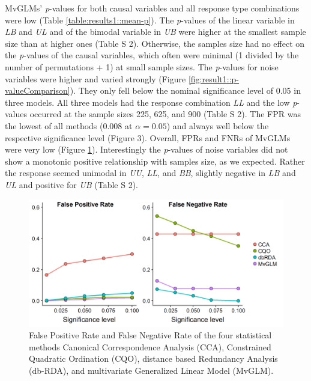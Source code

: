 		MvGLMs' \textit{p}-values for both causal variables and all response type combinations were low (Table  \ref{table:results1::mean-p}).
        The \textit{p}-values of the linear variable in \textit{LB} and \textit{UL} and of the bimodal variable in \textit{UB} were higher at the smallest sample size than at higher ones (Table S 2).  
		Otherwise, the samples size had no effect on the \textit{p}-values of the causal variables, which often were minimal (1 divided by the number of permutations + 1) at small sample sizes.
		The \textit{p}-values for noise variables were higher and varied strongly (Figure \ref{fig:result1::p-valueComparison}).
		They only fell below the nominal significance level of 0.05 in three models. 
		All three models had the response combination \textit{LL} and the low \textit{p}-values occurred at the sample sizes 225, 625, and 900 (Table S 2).
		The FPR was the lowest of all methods (0.008 at $\alpha = 0.05$) and always well below the respective significance level (Figure 3). 
		Overall, FPRs and FNRs of MvGLMs were very low (Figure \ref{fig:FPNR}).
        Interestingly the \textit{p}-values of noise variables did not show a monotonic positive relationship with samples size, as we expected. 
        Rather the response seemed unimodal in \textit{UU}, \textit{LL}, and \textit{BB}, slightly negative in \textit{LB} and \textit{UL} and positive for \textit{UB} (Table S 2). \\ 
        
        \begin{figure}[h]
            \centering
            \includegraphics[scale = 0.7]{figures/FPNR.png}
            \caption{False Positive Rate and False Negative Rate of the four statistical methods Canonical Correspondence Analysis (CCA), Constrained Quadratic Ordination (CQO), distance based Redundancy Analysis (db-RDA), and multivariate Generalized Linear Model (MvGLM). }
            \label{fig:FPNR}
        \end{figure}{}
                    
